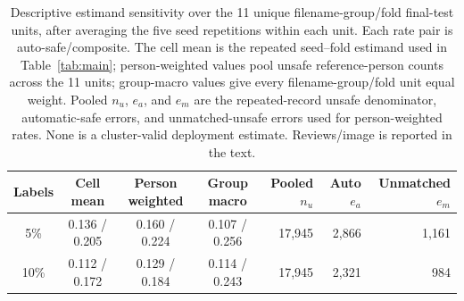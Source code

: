 \documentclass[iicol,pdflatex,sn-mathphys-num]{sn-jnl}
\begin{document}
\begin{table}[t]
\caption{Descriptive filename-group/fold distribution at the primary operating point after averaging the five seed repetitions within each unit. Entries are median [minimum, maximum] across 11 filename-group/fold units, not confidence intervals. The unit-size columns give median [minimum, maximum] images and unsafe-reference persons. Auto-safe and Composite use all unsafe reference persons as denominator. Complete worst-first unit rows, group names, denominators, unsafe-to-safe errors, and unmatched-unsafe counts are released with the audit artifact.}
\label{tab:sourcefold}
\centering
\scriptsize
\setlength{\tabcolsep}{4pt}
\end{table}

\begin{table}[t]
\caption{Descriptive estimand sensitivity over the 11 unique filename-group/fold final-test units, after averaging the five seed repetitions within each unit. Each rate pair is auto-safe/composite. The cell mean is the repeated seed--fold estimand used in Table~\ref{tab:main}; person-weighted values pool unsafe reference-person counts across the 11 units; group-macro values give every filename-group/fold unit equal weight. Pooled $n_u$, $e_a$, and $e_m$ are the repeated-record unsafe denominator, automatic-safe errors, and unmatched-unsafe errors used for person-weighted rates. None is a cluster-valid deployment estimate. Reviews/image is reported in the text.}
\label{tab:estimands}
\centering
\small
\setlength{\tabcolsep}{3pt}
\begin{tabular}{@{}c c c c r r r@{}}
\toprule
Labels & Cell mean & Person weighted & Group macro & Pooled $n_u$ & Auto $e_a$ & Unmatched $e_m$ \\
\midrule
5\%  & 0.136 / 0.205 & 0.160 / 0.224 & 0.107 / 0.256 & 17,945 & 2,866 & 1,161 \\
10\% & 0.112 / 0.172 & 0.129 / 0.184 & 0.114 / 0.243 & 17,945 & 2,321 & 984 \\
\bottomrule
\end{tabular}
\end{table}
\end{document}
